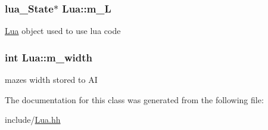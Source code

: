 \subsubsection[{m\+\_\+\+L}]{\setlength{\rightskip}{0pt plus 5cm}lua\+\_\+\+State$\ast$ Lua\+::m\+\_\+\+L\hspace{0.3cm}{\ttfamily [private]}}\label{class_lua_a3a68639a2ab4bf024edff06249133213}
\hyperlink{class_lua}{Lua} object used to use lua code \hypertarget{class_lua_a2b60317a0bed9ba18dd8190036f24f36}{}
\subsubsection[{m\+\_\+width}]{\setlength{\rightskip}{0pt plus 5cm}int Lua\+::m\+\_\+width\hspace{0.3cm}{\ttfamily [private]}}\label{class_lua_a2b60317a0bed9ba18dd8190036f24f36}
maze\textquotesingle{}s width stored to A\+I 

The documentation for this class was generated from the following file\+:\begin{DoxyCompactItemize}
\item 
include/\hyperlink{_lua_8hh}{Lua.\+hh}\end{DoxyCompactItemize}

